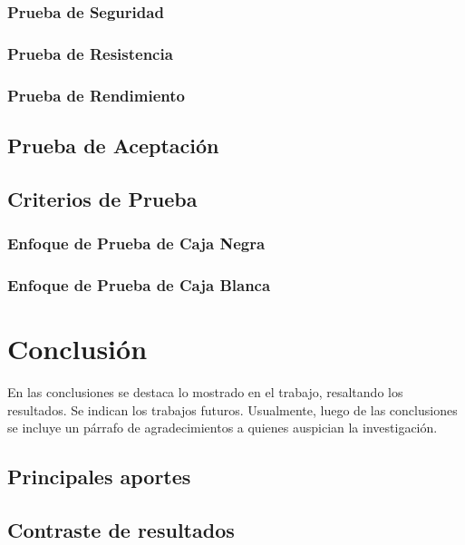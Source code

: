 \documentclass[letter,12pt]{report}
\begin{document}
\subsection{Prueba de Seguridad}
\subsection{Prueba de Resistencia}
\subsection{Prueba de Rendimiento}
\section{Prueba de Aceptación}
\section{Criterios de Prueba}
\subsection{Enfoque de Prueba de Caja Negra}
\subsection{Enfoque de Prueba de Caja Blanca}



\chapter{Conclusión}\label{conclusion}
En las conclusiones se destaca lo mostrado en el trabajo, resaltando los resultados. Se indican los trabajos futuros. Usualmente, luego de las conclusiones se incluye un párrafo de agradecimientos a quienes auspician la investigación.
\section{Principales aportes}
\section{Contraste de resultados}
\end{document}
